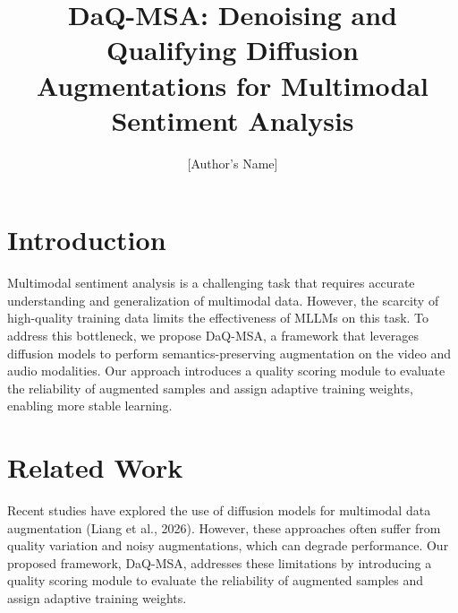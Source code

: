 \documentclass{article}
\begin{document}
\title{DaQ-MSA: Denoising and Qualifying Diffusion Augmentations for Multimodal Sentiment Analysis}

\author{[Author's Name]}

\maketitle


\section{Introduction}

Multimodal sentiment analysis is a challenging task that requires accurate understanding and generalization of multimodal data. However, the scarcity of high-quality training data limits the effectiveness of MLLMs on this task. To address this bottleneck, we propose DaQ-MSA, a framework that leverages diffusion models to perform semantics-preserving augmentation on the video and audio modalities. Our approach introduces a quality scoring module to evaluate the reliability of augmented samples and assign adaptive training weights, enabling more stable learning.

\section{Related Work}

Recent studies have explored the use of diffusion models for multimodal data augmentation (Liang et al., 2026). However, these approaches often suffer from quality variation and noisy augmentations, which can degrade performance. Our proposed framework, DaQ-MSA, addresses these limitations by introducing a quality scoring module to evaluate the reliability of augmented samples and assign adaptive training weights.
\end{document}
